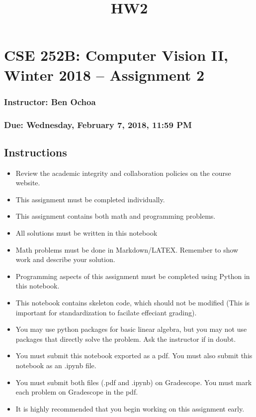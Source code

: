 \documentclass[11pt]{article}
\title{HW2}
\providecommand{\tightlist}{%
      \setlength{\itemsep}{0pt}\setlength{\parskip}{0pt}}
\begin{document}
    
    
    \maketitle
    
    

    
    \section{CSE 252B: Computer Vision II, Winter 2018 -- Assignment
2}\label{cse-252b-computer-vision-ii-winter-2018-assignment-2}

\subsubsection{Instructor: Ben Ochoa}\label{instructor-ben-ochoa}

\subsubsection{Due: Wednesday, February 7, 2018, 11:59
PM}\label{due-wednesday-february-7-2018-1159-pm}

    \subsection{Instructions}\label{instructions}

\begin{itemize}
\tightlist
\item
  Review the academic integrity and collaboration policies on the course
  website.
\item
  This assignment must be completed individually.
\item
  This assignment contains both math and programming problems.
\item
  All solutions must be written in this notebook
\item
  Math problems must be done in Markdown/LATEX. Remember to show work
  and describe your solution.
\item
  Programming aspects of this assignment must be completed using Python
  in this notebook.
\item
  This notebook contains skeleton code, which should not be modified
  (This is important for standardization to facilate effeciant grading).
\item
  You may use python packages for basic linear algebra, but you may not
  use packages that directly solve the problem. Ask the instructor if in
  doubt.
\item
  You must submit this notebook exported as a pdf. You must also submit
  this notebook as an .ipynb file.
\item
  You must submit both files (.pdf and .ipynb) on Gradescope. You must
  mark each problem on Gradescope in the pdf.
\item
  It is highly recommended that you begin working on this assignment
  early.
\end{itemize}
\end{document}
